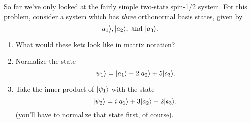\begin{problem}
\label{prob_3state}
So far we've only looked at the fairly simple two-state spin-1/2 system.  For this problem, consider a system which has \emph{three} orthonormal basis states, given by
\[
| a_1 \rangle, | a_2 \rangle, \text{ and }  | a_3 \rangle.
\]
\begin{enumerate}[label=(\alph*)]
\item What would these kets look like in matrix notation?
\item Normalize the state
\[
| \psi_1 \rangle = | a_1 \rangle - 2 | a_2 \rangle + 5 | a_3 \rangle.
\]
\item Take the inner product of $| \psi_1 \rangle$ with the state 
\[
| \psi_2 \rangle = i| a_1 \rangle + 3 | a_2 \rangle - 2| a_3 \rangle.
\]
(you'll have to normalize that state first, of course).
\end{enumerate}
\end{problem}

